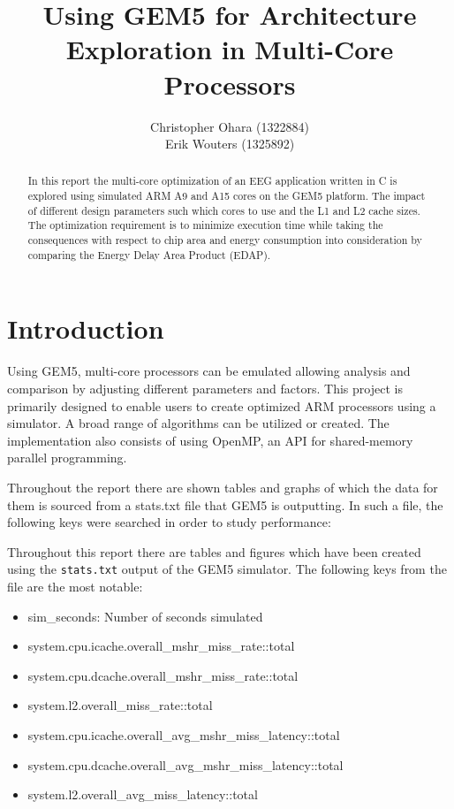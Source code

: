 \documentclass[a4paper, 10pt, conference]{ieeeconf}      %
\title{\LARGE \bf Using GEM5 for Architecture Exploration in Multi-Core Processors}
\author{Christopher Ohara (1322884) \\
Erik Wouters (1325892)
}
\begin{document}
\maketitle
\thispagestyle{empty}
\pagestyle{empty}

\begin{abstract}
In this report the multi-core optimization of an EEG application written in C is explored using simulated ARM A9 and A15 cores on the GEM5 platform. The impact of different design parameters such which cores to use and the L1 and L2 cache sizes. The optimization requirement is to minimize execution time while taking the consequences with respect to chip area and energy consumption into consideration by comparing the Energy Delay Area Product (EDAP).

\end{abstract}

\section{Introduction}
Using GEM5\cite{gem5}, multi-core processors can be emulated allowing analysis and comparison by adjusting different parameters and factors. This project is primarily designed to enable users to create optimized ARM processors using a simulator. A broad range of algorithms can be utilized or created. The implementation also consists of using OpenMP\cite{openmp}, an API for shared-memory parallel programming.

Throughout the report there are shown tables and
graphs of which the data for them is sourced from a
stats.txt file that GEM5 is outputting. In such a file,
the following keys were searched in order to study performance:


Throughout this report there are tables and figures which have been created using the \texttt{stats.txt} output of the GEM5 simulator. The following keys from the file are the most notable:
\begin{itemize}
    \item sim\_seconds: Number of seconds simulated
    \item system.cpu.icache.overall_mshr_miss_rate::total
    \item system.cpu.dcache.overall_mshr_miss_rate::total
    \item system.l2.overall_miss_rate::total
    \item system.cpu.icache.overall_avg_mshr_miss_latency::total
    \item system.cpu.dcache.overall_avg_mshr_miss_latency::total
    \item system.l2.overall_avg_miss_latency::total
\end{itemize}
\end{document}
